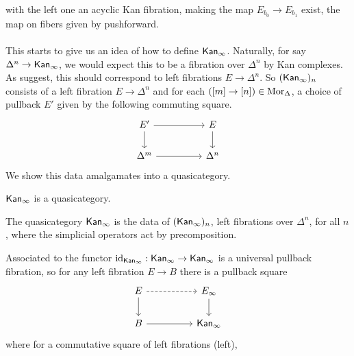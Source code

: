 with the left one an acyclic Kan fibration, making the map $E_{b_{0}}\to E_{b_{1}}$ exist, the map on fibers given by pushforward. 
\\\\
This starts to give us an idea of how to define $\Kan_{\infty}$. Naturally, for say $\Delta^{n}\to\mathsf{Kan}_{\infty}$, we would expect this to be a fibration over $\Delta^{n}$ by Kan complexes. As  suggest, this should correspond to left fibrations $E\to\Delta^{n}$. So $(\mathsf{Kan}_{\infty})_{n}$ consists of a left fibration $E\to\Delta^{n}$ and for each $([m]\to[n])\in\mathrm{Mor}_{\Updelta}$, a choice of pullback $E'$ given by the following commuting square. 
$$%
\begin{tikzcd}
	{E'} && E \\
	{\Delta^{m}} && {\Delta^{n}}
	\arrow[from=1-3, to=2-3]
	\arrow[from=1-1, to=2-1]
	\arrow[from=1-1, to=1-3]
	\arrow[from=2-1, to=2-3]
\end{tikzcd}$$
We show this data amalgamates into a quasicategory. 
\begin{theorem}\label{thm: Kan infinity is a quasicategory}
    $\Kan_{\infty}$ is a quasicategory. 
\end{theorem}
\begin{definition}[$\Kan_{\infty}$]\label{def: kan-infty}
    The quasicategory $\Kan_{\infty}$ is the data of $(\mathsf{Kan}_{\infty})_{n}$, left fibrations over $\Delta^{n}$, for all $n$, where the simplicial operators act by precomposition. 
\end{definition}
Associated to the functor $\mathrm{id}_{\mathsf{Kan}_{\infty}}:\mathsf{Kan}_{\infty}\to\mathsf{Kan}_{\infty}$ is a universal pullback fibration, so for any left fibration $E\to B$ there is a pullback square 
$$%
\begin{tikzcd}
	E && {E_{\infty}} \\
	B && {\Kan_{\infty}}
	\arrow[dashed, from=1-1, to=1-3]
	\arrow[from=1-3, to=2-3]
	\arrow[from=1-1, to=2-1]
	\arrow[from=2-1, to=2-3]
\end{tikzcd}$$ where for a commutative square of left fibrations (left), 
